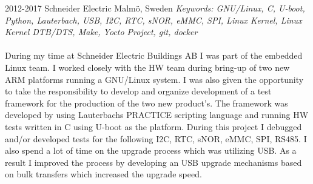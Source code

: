 \documentclass[nocolors]{template/friggeri-cv-a4}
\begin{document}
\begin{entrylist}
\entry
{2012-2017}
{Schneider Electric}
{Malmö, Sweden}
{\emph{Keywords: GNU/Linux, C, U-boot, Python, Lauterbach, USB, I2C, RTC, sNOR, eMMC, SPI, Linux Kernel, Linux Kernel DTB/DTS, Make, Yocto Project, git, docker} \\
\\
During my time at Schneider Electric Buildings AB I was part of the embedded Linux team. I worked closely with the HW team during bring-up of two new ARM platforms running a GNU/Linux system. I was also given the opportunity to take the responsibility to develop and organize development of a test framework for the production of the two new product's. The framework was developed by using Lauterbachs PRACTICE scripting language and running HW tests written in C using U-boot as the platform. During this project I debugged and/or developed tests for the following I2C, RTC, sNOR, eMMC, SPI, RS485. I also spend a lot of time on the upgrade process which was utilizing USB. As a result I improved the process by developing an USB upgrade mechanisms based on bulk transfers which increased the upgrade speed.
\\
}

\end{entrylist}
\end{document}
